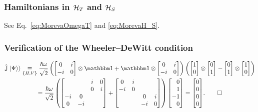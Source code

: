 \subsubsection*{Hamiltonians in $\mathcal{H}_T$ and $\mathcal{H}_S$}

See Eq.~\eqref{eq:MorevaOmegaT} and \eqref{eq:MorevaH_S}.

\subsubsection*{Verification of the Wheeler--DeWitt condition}

\begin{multline}\label{eq:pw:moreva:WheelerDeWittVerification}
  \op{\mathbb{J}} \dket{\Psi}
  \repr[\setof{H, V}]
  \frac{\hbar\omega}{\sqrt{2}}
  \left(
    \left[\begin{matrix}0 & i\\- i & 0\end{matrix}\right]
    \ox
    \idop
    +
    \idop
    \ox
    \left[\begin{matrix}0 & i\\- i & 0\end{matrix}\right]
  \right)
  \left(
    \left[\begin{matrix}1\\0\end{matrix}\right] \ox \left[\begin{matrix}0\\1\end{matrix}\right]
    -
    \left[\begin{matrix}0\\1\end{matrix}\right] \ox \left[\begin{matrix}1\\0\end{matrix}\right]
  \right)
  \\
  =
  \frac{\hbar\omega}{\sqrt{2}}
  \left(
    \left[\begin{matrix}  &   & i & 0\\  &   & 0 & i\\- i & 0 &   &  \\0 & - i &   &  \end{matrix}\right]
    +
    \left[\begin{matrix}0 & i &   &  \\- i & 0 &   &  \\  &   & 0 & i\\  &   & - i & 0\end{matrix}\right]
  \right)
  \begin{bmatrix*}[r]
    0 \\ 1 \\ -1 \\ 0
  \end{bmatrix*}
  =
  \mqty[0 \\ 0 \\ 0 \\ 0]
  \text{.}
  \qed
\end{multline}

